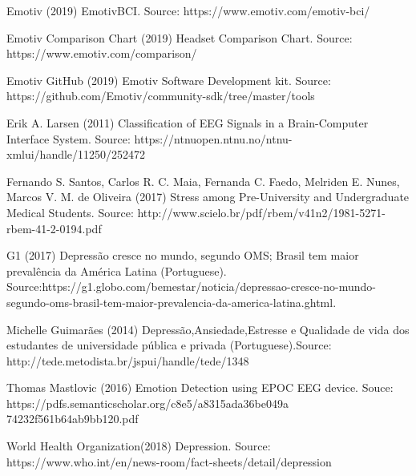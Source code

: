 \documentclass[12pt,openright,a4paper]{article}
\begin{document}
  Emotiv (2019) EmotivBCI. Source: https://www.emotiv.com/emotiv-bci/ \newline
  
  Emotiv Comparison Chart (2019) Headset Comparison Chart. Source: https://www.emotiv.com/comparison/ \newline
  
  Emotiv GitHub (2019) Emotiv Software Development kit. Source: https://github.com/Emotiv/community-sdk/tree/master/tools \newline
  
  Erik A. Larsen (2011) Classification of EEG Signals in a Brain-Computer Interface System. Source: https://ntnuopen.ntnu.no/ntnu-xmlui/handle/11250/252472 \newline
  
  Fernando S. Santos, Carlos R. C. Maia, Fernanda C. Faedo, Melriden E. Nunes, Marcos V. M. de Oliveira (2017) Stress among Pre-University and Undergraduate
  Medical Students. Source: http://www.scielo.br/pdf/rbem/v41n2/1981-5271-rbem-41-2-0194.pdf 
  
  G1 (2017) Depressão cresce no mundo, segundo OMS; Brasil tem maior prevalência da América Latina (Portuguese). Source:https://g1.globo.com/bemestar/noticia/depressao-cresce-no-mundo-segundo-oms-brasil-tem-maior-prevalencia-da-america-latina.ghtml.\newline
  
  
  Michelle Guimarães (2014) Depressão,Ansiedade,Estresse e Qualidade de vida dos estudantes de universidade pública e privada (Portuguese).Source: http://tede.metodista.br/jspui/handle/tede/1348 \newline 
  
  Thomas Mastlovic (2016) Emotion Detection using EPOC EEG device. Souce: https://pdfs.semanticscholar.org/c8e5/a8315ada36be049a\\74232f561b64ab9bb120.pdf \newline
  
  World Health Organization(2018) Depression. Source: https://www.who.int/en/news-room/fact-sheets/detail/depression \newline
  
  
\end{document}
